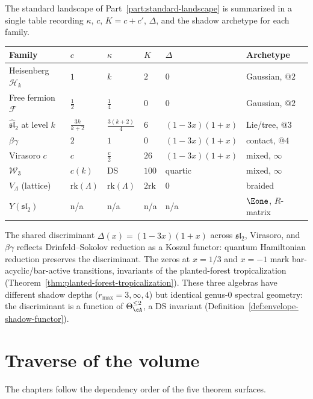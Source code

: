 The standard landscape of Part~\ref{part:standard-landscape} is summarized in a single table recording $\kappa$, $c$, $K = c + c'$, $\Delta$, and the shadow archetype for each family.

\begin{center}
\small
\begin{tabular}{llllll}
\textbf{Family} & $c$ & $\kappa$ & $K$ & $\Delta$ & \textbf{Archetype} \\ \hline
Heisenberg $\mathcal{H}_k$ & $1$ & $k$ & $2$ & $0$ & Gaussian, $@2$ \\[2pt]
Free fermion $\mathcal{F}$ & $\frac{1}{2}$ & $\frac{1}{4}$ & $0$ & $0$ & Gaussian, $@2$ \\[2pt]
$\widehat{\mathfrak{sl}}_2$ at level $k$ & $\frac{3k}{k+2}$ & $\frac{3(k+2)}{4}$ & $6$ & $(1-3x)(1+x)$ & Lie/tree, $@3$ \\[2pt]
$\beta\gamma$ & $2$ & $1$ & $0$ & $(1-3x)(1+x)$ & contact, $@4$ \\[2pt]
Virasoro $c$ & $c$ & $\frac{c}{2}$ & $26$ & $(1-3x)(1+x)$ & mixed, $\infty$ \\[2pt]
$\mathcal{W}_3$ & $c(k)$ & DS & $100$ & quartic & mixed, $\infty$ \\[2pt]
$V_\Lambda$ (lattice) & $\mathrm{rk}(\Lambda)$ & $\mathrm{rk}(\Lambda)$ & $2\mathrm{rk}$ & $0$ & braided \\[2pt]
$Y(\mathfrak{sl}_2)$ & n/a & n/a & n/a & n/a & $\Eone$, $R$-matrix
\end{tabular}
\end{center}
\noindent
The shared discriminant $\Delta(x) = (1-3x)(1+x)$ across $\widehat{\mathfrak{sl}}_2$, Virasoro, and $\beta\gamma$ reflects Drinfeld--Sokolov reduction as a Koszul functor: quantum Hamiltonian reduction preserves the discriminant. The zeros at $x = 1/3$ and $x = -1$ mark bar-acyclic/bar-active transitions, invariants of the planted-forest tropicalization (Theorem~\ref{thm:planted-forest-tropicalization}). These three algebras have different shadow depths ($r_{\max} = 3, \infty, 4$) but identical genus-$0$ spectral geometry: the discriminant is a function of $\Theta_\cA^{\leq 2}$, a DS invariant (Definition~\ref{def:envelope-shadow-functor}).

\section{Traverse of the volume}
\label{sec:traverse}

The chapters follow the dependency order of the five theorem surfaces.
\label{subsec:traverse-part-I}%
\label{subsec:traverse-part-II}%
\label{subsec:traverse-part-III}%
\label{subsec:traverse-part-IV}%


